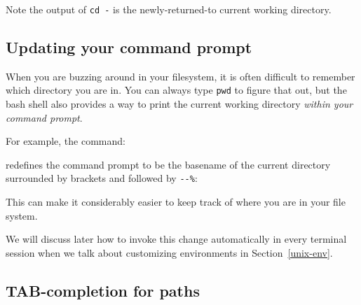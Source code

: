 \documentclass[]{krantz}
\makeatletter
\newenvironment{Shaded}{\begin{snugshade}}{\end{snugshade}}
\newcommand{\ExtensionTok}[1]{#1}
\newcommand{\NormalTok}[1]{#1}
\newcommand{\StringTok}[1]{\textcolor[rgb]{0.5,0.5,0.5}{#1}}
\newcommand{\VariableTok}[1]{\textcolor[rgb]{0,0,0}{#1}}
\newenvironment{kframe}{%
\medskip{}
\setlength{\fboxsep}{.8em}
 \def\at@end@of@kframe{}%
 \ifinner\ifhmode%
  \def\at@end@of@kframe{\end{minipage}}%
  \begin{minipage}{\columnwidth}%
 \fi\fi%
 \def\FrameCommand##1{\hskip\@totalleftmargin \hskip-\fboxsep
 \colorbox{shadecolor}{##1}\hskip-\fboxsep
     \hskip-\linewidth \hskip-\@totalleftmargin \hskip\columnwidth}%
 \MakeFramed {\advance\hsize-\width
   \@totalleftmargin\z@ \linewidth\hsize
   \@setminipage}}%
 {\par\unskip\endMakeFramed%
 \at@end@of@kframe}
\renewenvironment{Shaded}{\begin{kframe}}{\end{kframe}}
\makeatother
\begin{document}
Note the output of \texttt{cd\ -} is the newly-returned-to current working directory.

\hypertarget{updating-your-command-prompt}{%
\subsection{Updating your command prompt}\label{updating-your-command-prompt}}

When you are buzzing around in your filesystem, it is often difficult to remember
which directory you are in. You can always type \texttt{pwd} to figure that out,
but the bash shell also provides a way to print the current working directory
\emph{within your command prompt}.

For example, the command:

\begin{Shaded}
\end{Shaded}

redefines the command prompt to be the basename of the current directory surrounded
by brackets and followed by \texttt{-\/-\%}:

\begin{Shaded}
\end{Shaded}

This can make it considerably easier to keep track of where you are in your file system.

We will discuss later how to invoke this change automatically in every terminal session
when we talk about customizing environments in Section~\ref{unix-env}.

\hypertarget{tab-completion-for-paths}{%
\subsection{TAB-completion for paths}\label{tab-completion-for-paths}}
\end{document}
